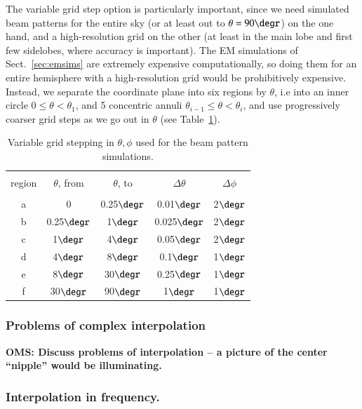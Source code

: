 \documentclass{aa}
\begin{document}
The variable grid step option is particularly important, since we need simulated beam patterns for the entire sky (or at least out to $\theta=90\degr$) on the one hand, and a high-resolution grid on the other (at least in the main lobe and first few sidelobes, where accuracy is important). The EM simulations of Sect.~\ref{sec:emsims} are extremely expensive computationally, so doing them for an entire hemisphere with a high-resolution grid would be prohibitively expensive. Instead, we separate the coordinate plane into six regions by $\theta$, i.e into an inner circle $0\leq\theta<\theta_1$, and 5 concentric annuli $\theta_{i-1}\leq\theta<\theta_i$, and use progressively coarser grid steps as we go out in $\theta$ (see Table~\ref{tab:grids}). 

\begin{table}
\begin{center}
  \begin{tabular}[]{ccccc}
  \hline
  \hline
  & & & &\\ [-1ex]
    region & $\theta$, from & $\theta$, to & $\Delta\theta$ & $\Delta\phi$ \\
  \hline
  & & & & \\ [-1ex]
    a & 0 & 0.25$\degr$ & 0.01$\degr$ & 2$\degr$ \\ 
    b & 0.25$\degr$ & 1$\degr$ & 0.025$\degr$ & 2$\degr$ \\ 
    c & 1$\degr$ & 4$\degr$ & 0.05$\degr$ & 2$\degr$ \\ 
    d & 4$\degr$ & 8$\degr$ & 0.1$\degr$ & 1$\degr$ \\ 
    e & 8$\degr$ & 30$\degr$ & 0.25$\degr$ & 1$\degr$ \\ 
    f & 30$\degr$ & 90$\degr$ & 1$\degr$ & 1$\degr$ \\ 
  \hline
  \end{tabular}
\end{center}
\caption{\label{tab:grids}Variable grid stepping in $\theta,\phi$ used for the beam pattern simulations.}
\end{table}


\subsubsection{Problems of complex interpolation} 

{\bf OMS: Discuss problems of interpolation -- a picture of the center ``nipple'' would be illuminating.}

\subsubsection{Interpolation in frequency.}
\end{document}
